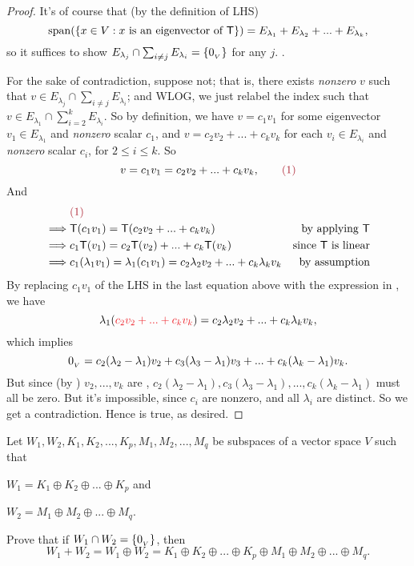 \begin{proof}
It's of course that (by the definition of LHS)
\[
    \operatorname{span}(\{ x \in V: x \text{ is an eigenvector of } \textsf{T} \}) = E_{\lambda_1} + E_{\lambda_2} + ... + E_{\lambda_k},
\]
so it suffices to show \(E_{\lambda_j} \cap \sum_{i \ne j} E_{\lambda_i} = \{ 0_{_V} \}\) for any \(j\). .

For the sake of contradiction, suppose not;
that is, there exists \emph{nonzero} \(v\) such that \(v \in E_{\lambda_j} \cap \sum_{i \ne j} E_{\lambda_i}\);
and WLOG, we just relabel the index such that
\(v \in E_{\lambda_1} \cap \sum_{i = 2}^k E_{\lambda_i}\).
So by definition, we have \(v = c_1 v_1\) for some eigenvector \(v_1 \in E_{\lambda_1}\) and \emph{nonzero} scalar \(c_1\), and \(v = c_2 v_2 + ... + c_k v_k\) for each \(v_i \in E_{\lambda_i}\) and \emph{nonzero} scalar \(c_i\), for \(2 \le i \le k\).
So
\[
    v = c_1 v_1 = c_2 v_2 + ... + c_k v_k, \quad \quad \MAROON{(1)}
\]
And
\begin{align*}
             & \MAROON{(1)} \\
    \implies & \T(c_1 v_1) = \T(c_2 v_2 + ... + c_k v_k) & \text{by applying \(\T\)} \\
    \implies & c_1\T(v_1) = c_2\T(v_2) + ... + c_k\T(v_k) & \text{since \(\T\) is linear} \\
    \implies & c_1 (\lambda_1 v_1) = \lambda_1 (c_1 v_1) = c_2 \lambda_2 v_2 + ... + c_k \lambda_k v_k & \text{by assumption}
\end{align*}
By replacing \(c_1 v_1\) of the LHS in the last equation above with the expression in , we have
\[
    \lambda_1 (\RED{c_2 v_2 + ... + c_k v_k}) = c_2 \lambda_2 v_2 + ... + c_k \lambda_k v_k,
\]
which implies
\[
    0_{_V} = c_2 (\lambda_2 - \lambda_1) v_2 + c_3 (\lambda_3 - \lambda_1) v_3 + ... + c_k (\lambda_k - \lambda_1) v_k.
\]
But since (by ) \(v_2, ..., v_k\) are \LID{}, \(c_2(\lambda_2 - \lambda_1), c_3(\lambda_3 - \lambda_1), ..., c_k(\lambda_k - \lambda_1)\) must all be zero.
But it's impossible, since \(c_i\) are nonzero, and all \(\lambda_i\) are distinct.
So we get a contradiction.
Hence  is true, as desired.
\end{proof}

\begin{exercise} \label{exercise 5.2.24}
Let \(W_1, W_2, K_1, K_2, ..., K_p, M_1, M_2, ..., M_q\) be subspaces of a vector space \(V\) such that

 \(W_1 = K_1 \oplus K_2 \oplus ... \oplus K_p\) and

 \(W_2 = M_1 \oplus M_2 \oplus ... \oplus M_q\).

Prove that if  \(W_1 \cap W_2 = \{ 0_{_V} \}\), then
\[
    W_1 + W_2 = W_1 \oplus W_2 = K_1 \oplus K_2 \oplus ... \oplus K_p \oplus M_1 \oplus M_2 \oplus ... \oplus M_q.
\]
\end{exercise}

